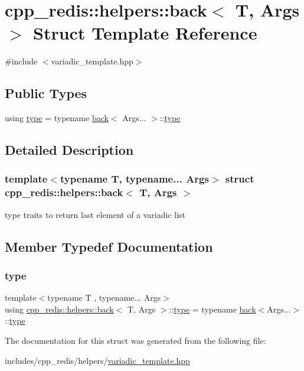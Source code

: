 \hypertarget{structcpp__redis_1_1helpers_1_1back}{}\section{cpp\+\_\+redis\+:\+:helpers\+:\+:back$<$ T, Args $>$ Struct Template Reference}
\label{structcpp__redis_1_1helpers_1_1back}


{\ttfamily \#include $<$variadic\+\_\+template.\+hpp$>$}

\subsection*{Public Types}
\begin{DoxyCompactItemize}
\item 
using \hyperlink{structcpp__redis_1_1helpers_1_1back_a83f1d0c03ffc82ff8ab7243c3c858195}{type} = typename \hyperlink{structcpp__redis_1_1helpers_1_1back}{back}$<$ Args... $>$\+::\hyperlink{structcpp__redis_1_1helpers_1_1back_a83f1d0c03ffc82ff8ab7243c3c858195}{type}
\end{DoxyCompactItemize}


\subsection{Detailed Description}
\subsubsection*{template$<$typename T, typename... Args$>$\newline
struct cpp\+\_\+redis\+::helpers\+::back$<$ T, Args $>$}

type traits to return last element of a variadic list 

\subsection{Member Typedef Documentation}
\mbox{\label{structcpp__redis_1_1helpers_1_1back_a83f1d0c03ffc82ff8ab7243c3c858195}} 
\subsubsection{\texorpdfstring{type}{type}}
{\footnotesize\ttfamily template$<$typename T , typename... Args$>$ \\
using \hyperlink{structcpp__redis_1_1helpers_1_1back}{cpp\+\_\+redis\+::helpers\+::back}$<$ T, Args $>$\+::\hyperlink{structcpp__redis_1_1helpers_1_1back_a83f1d0c03ffc82ff8ab7243c3c858195}{type} =  typename \hyperlink{structcpp__redis_1_1helpers_1_1back}{back}$<$Args...$>$\+::\hyperlink{structcpp__redis_1_1helpers_1_1back_a83f1d0c03ffc82ff8ab7243c3c858195}{type}}



The documentation for this struct was generated from the following file\+:\begin{DoxyCompactItemize}
\item 
includes/cpp\+\_\+redis/helpers/\hyperlink{variadic__template_8hpp}{variadic\+\_\+template.\+hpp}\end{DoxyCompactItemize}
